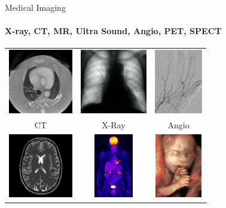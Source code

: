 \begin{frame}[c]{Medical Imaging}
	\framesubtitle{X-ray, CT, MR, Ultra Sound, Angio, PET, SPECT}
	\centering{}
	\begin{tabular}{ccc}

		\includegraphics[height=2.8cm]{../02_image_processing/img/m1000-1000HU.png}    &
		\includegraphics[height=2.8cm]{../06_x-ray/Siemens_Images/150_7.png}           &
		\includegraphics[height=2.8cm]{../06_x-ray/images/dsa_diff.pdf}                                      \\
		CT                                                                           & X-Ray & Angio       \\[0.2cm]
		\includegraphics[height=2.8cm]{images/parallel_full.png}      &
		\includegraphics[height=2.8cm]{images/appB.png} &
		\includegraphics[height=2.8cm]{images/SH_US_34572_12.jpg}                   \\

\end{tabular}
\end{frame}
